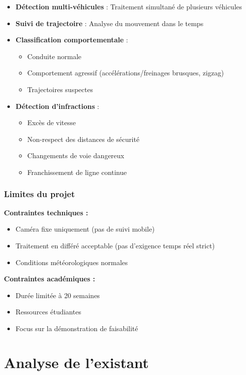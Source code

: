 \documentclass[12pt,a4paper]{article}
\begin{document}
\begin{itemize}
    \item \textbf{Détection multi-véhicules} : Traitement simultané de plusieurs véhicules
    \item \textbf{Suivi de trajectoire} : Analyse du mouvement dans le temps
    \item \textbf{Classification comportementale} :
    \begin{itemize}
        \item Conduite normale
        \item Comportement agressif (accélérations/freinages brusques, zigzag)
        \item Trajectoires suspectes
    \end{itemize}
    \item \textbf{Détection d'infractions} :
    \begin{itemize}
        \item Excès de vitesse
        \item Non-respect des distances de sécurité
        \item Changements de voie dangereux
        \item Franchissement de ligne continue
    \end{itemize}
\end{itemize}

\subsubsection{Limites du projet}

\textbf{Contraintes techniques :}
\begin{itemize}
    \item Caméra fixe uniquement (pas de suivi mobile)
    \item Traitement en différé acceptable (pas d'exigence temps réel strict)
    \item Conditions météorologiques normales
\end{itemize}

\textbf{Contraintes académiques :}
\begin{itemize}
    \item Durée limitée à 20 semaines
    \item Ressources étudiantes
    \item Focus sur la démonstration de faisabilité
\end{itemize}

\section{Analyse de l'existant}
\end{document}
